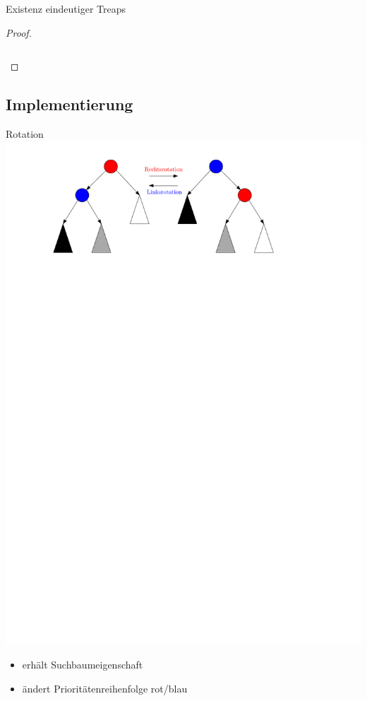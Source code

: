 \documentclass[t]{beamer}
\theoremstyle{plain}
\begin{document}
\begin{frame}{Existenz eindeutiger Treaps}
{\begin{proof}
{\begin{columns}
\begin{column}[t]{0.35\textwidth}
        \end{column}
        \end{columns}}
    \end{proof}}
\end{frame}

\subsection{Implementierung}
\begin{frame}{Rotation}
    \includegraphics[width=\textwidth]{img/Tree_Rotation_color.pdf}
    \begin{itemize}
        \item<2-> erhält Suchbaumeigenschaft
        \item<3-> ändert Prioritätenreihenfolge rot/blau
    \end{itemize}
\end{frame}
\end{document}
